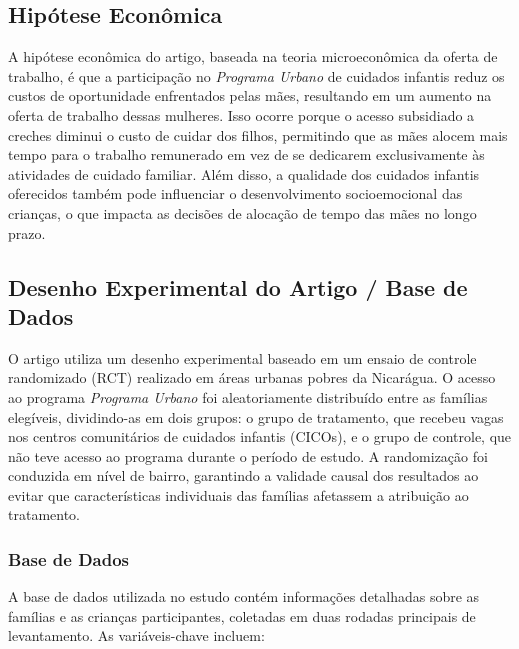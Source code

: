 \documentclass[a4paper,12pt]{article}[abntex2]
\begin{document}
\subsection{\textbf{Hipótese Econômica}}

A hipótese econômica do artigo, baseada na teoria microeconômica da oferta de trabalho, é que a participação no \textit{Programa Urbano} de cuidados infantis reduz os custos de oportunidade enfrentados pelas mães, resultando em um aumento na oferta de trabalho dessas mulheres. Isso ocorre porque o acesso subsidiado a creches diminui o custo de cuidar dos filhos, permitindo que as mães alocem mais tempo para o trabalho remunerado em vez de se dedicarem exclusivamente às atividades de cuidado familiar. Além disso, a qualidade dos cuidados infantis oferecidos também pode influenciar o desenvolvimento socioemocional das crianças, o que impacta as decisões de alocação de tempo das mães no longo prazo.
\subsection{\textbf{Desenho Experimental do Artigo / Base de Dados}}

O artigo utiliza um desenho experimental baseado em um ensaio de controle randomizado (RCT) realizado em áreas urbanas pobres da Nicarágua. O acesso ao programa \textit{Programa Urbano} foi aleatoriamente distribuído entre as famílias elegíveis, dividindo-as em dois grupos: o grupo de tratamento, que recebeu vagas nos centros comunitários de cuidados infantis (CICOs), e o grupo de controle, que não teve acesso ao programa durante o período de estudo. A randomização foi conduzida em nível de bairro, garantindo a validade causal dos resultados ao evitar que características individuais das famílias afetassem a atribuição ao tratamento.

\subsubsection*{Base de Dados}

A base de dados utilizada no estudo contém informações detalhadas sobre as famílias e as crianças participantes, coletadas em duas rodadas principais de levantamento. As variáveis-chave incluem:
\end{document}

